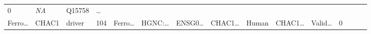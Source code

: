 \documentclass[
]{article}
\begin{document}
\begin{longtable}[]{@{}lllllllllllllll@{}}
\begin{minipage}[t]{0.05\columnwidth}
0\strut
\end{minipage} & \begin{minipage}[t]{0.05\columnwidth}\raggedright
\emph{NA}\strut
\end{minipage} & \begin{minipage}[t]{0.05\columnwidth}\raggedright
Q15758\strut
\end{minipage} & \begin{minipage}[t]{0.02\columnwidth}\raggedright
\ldots{}\strut
\end{minipage}\tabularnewline
\begin{minipage}[t]{0.05\columnwidth}\raggedright
Ferro\ldots{}\strut
\end{minipage} & \begin{minipage}[t]{0.05\columnwidth}\raggedright
CHAC1\strut
\end{minipage} & \begin{minipage}[t]{0.04\columnwidth}\raggedright
driver\strut
\end{minipage} & \begin{minipage}[t]{0.02\columnwidth}\raggedright
104\strut
\end{minipage} & \begin{minipage}[t]{0.05\columnwidth}\raggedright
Ferro\ldots{}\strut
\end{minipage} & \begin{minipage}[t]{0.05\columnwidth}\raggedright
HGNC:\ldots{}\strut
\end{minipage} & \begin{minipage}[t]{0.05\columnwidth}\raggedright
ENSG0\ldots{}\strut
\end{minipage} & \begin{minipage}[t]{0.05\columnwidth}\raggedright
CHAC1\ldots{}\strut
\end{minipage} & \begin{minipage}[t]{0.05\columnwidth}\raggedright
Human\strut
\end{minipage} & \begin{minipage}[t]{0.05\columnwidth}\raggedright
CHAC1\ldots{}\strut
\end{minipage} & \begin{minipage}[t]{0.05\columnwidth}\raggedright
Valid\ldots{}\strut
\end{minipage} & \begin{minipage}[t]{0.05\columnwidth}\raggedright
0\strut
\end{minipage} & \begin{minipage}[t]{0.05\columnwidth}\raggedright

\end{minipage}
\end{longtable}
\end{document}
